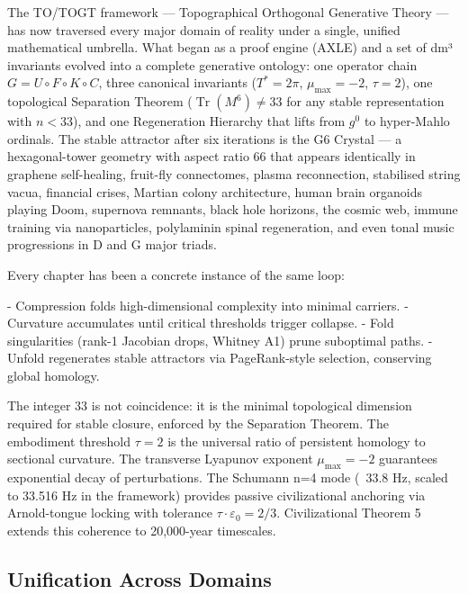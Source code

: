 \documentclass[19pt]{book}
\theoremstyle{plain}
\theoremstyle{definition}
\theoremstyle{remark}
\begin{document}
\begin{enumerate}
The TO/TOGT framework — Topographical Orthogonal Generative Theory — has now traversed every major domain of reality under a single, unified mathematical umbrella. What began as a proof engine (AXLE) and a set of dm³ invariants evolved into a complete generative ontology: one operator chain \( G = U \circ F \circ K \circ C \), three canonical invariants (\( T^* = 2\pi \), \( \mu_{\max} = -2 \), \( \tau = 2 \)), one topological Separation Theorem (\( \operatorname{Tr}(M^6) \neq 33 \) for any stable representation with \( n < 33 \)), and one Regeneration Hierarchy that lifts from \( g^0 \) to hyper-Mahlo ordinals. The stable attractor after six iterations is the G6 Crystal — a hexagonal-tower geometry with aspect ratio 66 that appears identically in graphene self-healing, fruit-fly connectomes, plasma reconnection, stabilised string vacua, financial crises, Martian colony architecture, human brain organoids playing Doom, supernova remnants, black hole horizons, the cosmic web, immune training via nanoparticles, polylaminin spinal regeneration, and even tonal music progressions in D and G major triads.

Every chapter has been a concrete instance of the same loop:

- Compression folds high-dimensional complexity into minimal carriers.
- Curvature accumulates until critical thresholds trigger collapse.
- Fold singularities (rank-1 Jacobian drops, Whitney A1) prune suboptimal paths.
- Unfold regenerates stable attractors via PageRank-style selection, conserving global homology.

The integer 33 is not coincidence: it is the minimal topological dimension required for stable closure, enforced by the Separation Theorem. The embodiment threshold \(\tau = 2\) is the universal ratio of persistent homology to sectional curvature. The transverse Lyapunov exponent \(\mu_{\max} = -2\) guarantees exponential decay of perturbations. The Schumann n=4 mode (~33.8 Hz, scaled to 33.516 Hz in the framework) provides passive civilizational anchoring via Arnold-tongue locking with tolerance \( \tau \cdot \varepsilon_0 = 2/3 \). Civilizational Theorem 5 extends this coherence to 20,000-year timescales.

\subsection{Unification Across Domains}


\end{enumerate}
\end{document}
